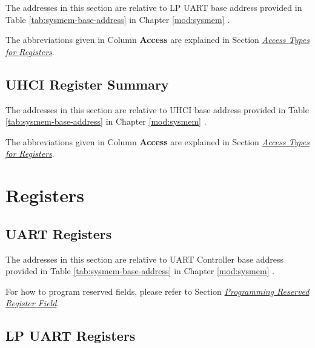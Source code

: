 \documentclass[main\_\_EN.tex]{subfiles}
\begin{document}
The addresses in this section are relative to LP UART base address provided in Table \ref{tab:sysmem-base-address} in Chapter \ref{mod:sysmem} \textit{}.

The abbreviations given in Column \textbf{Access} are explained in Section \hyperref[glossary-access-types]{\textit{Access Types for Registers}}.




\subsection{UHCI Register Summary}

The addresses in this section are relative to UHCI base address provided in Table \ref{tab:sysmem-base-address} in Chapter \ref{mod:sysmem} \textit{}.

The abbreviations given in Column \textbf{Access} are explained in Section \hyperref[glossary-access-types]{\textit{Access Types for Registers}}.






\clearpage
\section{Registers}


\subsection{UART Registers}

The addresses in this section are relative to UART Controller base address provided in Table \ref{tab:sysmem-base-address} in Chapter \ref{mod:sysmem} \textit{}.

For how to program reserved fields, please refer to Section \hyperref[programming-reserved-field]{\textit{Programming Reserved Register Field}}.




\clearpage
\subsection{LP UART Registers}
\end{document}
